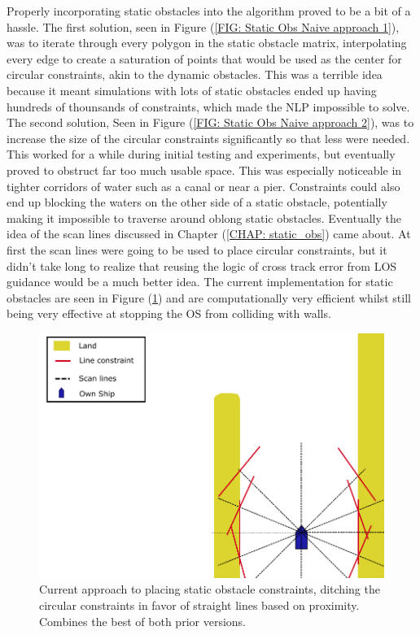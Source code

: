 Properly incorporating static obstacles into the algorithm proved to be a bit of a hassle. The first solution, seen in 
Figure (\ref{FIG: Static Obs Naive approach 1}), was to iterate through every polygon in the static obstacle matrix, interpolating
every edge to create a saturation of points that would be used as the center for circular constraints, akin to the dynamic
obstacles. This was a terrible idea because it meant simulations with lots of static obstacles ended up having hundreds of thounsands
of constraints, which made the \gls{NLP} impossible to solve. 
The second solution, Seen in Figure (\ref{FIG: Static Obs Naive approach 2}), was to increase the size of the circular constraints
significantly so that less were needed. This worked for a while during initial testing and experiments, 
but eventually proved to obstruct far too much usable space. This was especially
noticeable in tighter corridors of water such as a canal or near a pier. Constraints could also end up blocking the waters
on the other side of a static obstacle, potentially making it impossible to traverse around oblong static obstacles.
Eventually the idea of the scan lines discussed in Chapter (\ref{CHAP: static_obs}) came about. At first the scan lines
were going to be used to place circular constraints, but it didn't take long to realize that reusing the logic of cross track
error from LOS guidance would be a much better idea. The current implementation for static obstacles are seen in 
Figure (\ref{FIG: Static Obs Lines}) and are computationally very efficient whilst still being very effective at stopping the
\gls{OS} from colliding with walls. 

\begin{figure}[ht!]
    \centering
    \includegraphics[width=\textwidth]{Images/StaticObs_lines.pdf}
    \caption{Current approach to placing static obstacle constraints, 
    ditching the circular constraints in favor of straight lines based on proximity. 
    Combines the best of both prior versions.}     \label{FIG: Static Obs Lines}
\end{figure} 


